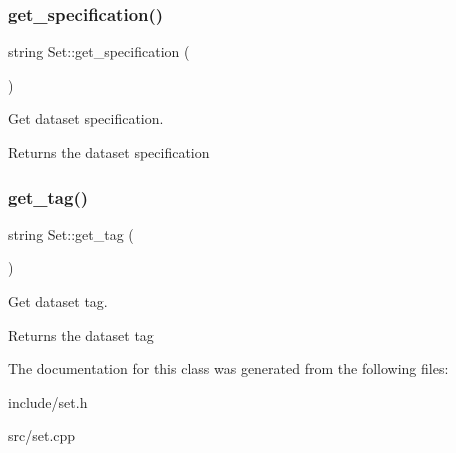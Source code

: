 \subsubsection{\texorpdfstring{get\+\_\+specification()}{get\_specification()}}
{\footnotesize\ttfamily string Set\+::get\+\_\+specification (\begin{DoxyParamCaption}{ }\end{DoxyParamCaption})}

Get dataset specification. \begin{DoxyReturn}{Returns}
the dataset specification 
\end{DoxyReturn}
\mbox{\label{classSet_af7ed351b5ee2bd4f2b8c306ce16ba0a9}} 
\subsubsection{\texorpdfstring{get\+\_\+tag()}{get\_tag()}}
{\footnotesize\ttfamily string Set\+::get\+\_\+tag (\begin{DoxyParamCaption}{ }\end{DoxyParamCaption})}

Get dataset tag. \begin{DoxyReturn}{Returns}
the dataset tag 
\end{DoxyReturn}


The documentation for this class was generated from the following files\+:\begin{DoxyCompactItemize}
\item 
include/set.\+h\item 
src/set.\+cpp\end{DoxyCompactItemize}
